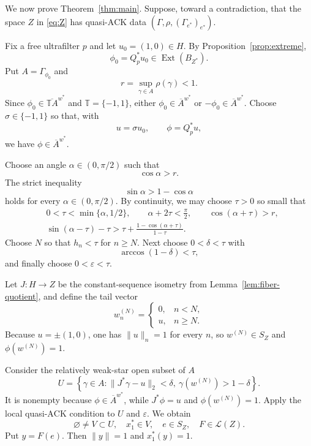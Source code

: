 \documentclass[11pt]{article}
\theoremstyle{definition}
\newcommand{\T}{\mathbb T}
\newcommand{\Ext}{\operatorname{Ext}}
\newcommand{\Lin}{\mathcal L}
\newcommand{\eps}{\varepsilon}
\newcommand{\ACK}{\mathrm{ACK}}
\begin{document}
We now prove Theorem~\ref{thm:main}.  Suppose, toward a contradiction, that the
space $Z$ in \eqref{eq:Z} has quasi-$\ACK$ data
$(\Gamma,\rho,(\Gamma_{e^*})_{e^*})$.

Fix a free ultrafilter $p$ and let $u_0=(1,0)\in H$.  By
Proposition~\ref{prop:extreme},
\[
  \phi_0=Q_p^*u_0\in\Ext(B_{Z^*}).
\]
Put $A=\Gamma_{\phi_0}$ and
\[
  r=\sup_{\gamma\in A}\rho(\gamma)<1.
\]
Since $\phi_0\in\overline{\T A}^{w^*}$ and $\T=\{-1,1\}$, either
$\phi_0\in\overline A^{w^*}$ or
$-\phi_0\in\overline A^{w^*}$.  Choose $\sigma\in\{-1,1\}$ so that, with
\[
  u=\sigma u_0,
  \qquad \phi=Q_p^*u,
\]
we have $\phi\in\overline A^{w^*}$.

Choose an angle $\alpha\in(0,\pi/2)$ such that
\begin{equation}\label{eq:alpha}
  \cos\alpha>r.
\end{equation}
The strict inequality
\[
  \sin\alpha>1-\cos\alpha
\]
holds for every $\alpha\in(0,\pi/2)$.  By continuity, we may choose
$\tau>0$ so small that
\begin{align}
 &0<\tau<\min\{\alpha,1/2\},\qquad
   \alpha+2\tau<\frac\pi2,\qquad
   \cos(\alpha+\tau)>r,                                      \label{eq:tau1}\\
 &\sin(\alpha-\tau)-\tau
   >\tau+\frac{1-\cos(\alpha+\tau)}{1-\tau}.                 \label{eq:tau2}
\end{align}
Choose $N$ so that $h_n<\tau$ for $n\ge N$.  Next choose
$0<\delta<\tau$ with
\begin{equation}\label{eq:delta}
  \arccos(1-\delta)<\tau,
\end{equation}
and finally choose $0<\eps<\tau$.

Let $J:H\to Z$ be the constant-sequence isometry from
Lemma~\ref{lem:fiber-quotient}, and define the tail vector
\[
 w^{(N)}_n=
 \begin{cases}
  0,&n<N,\\
  u,&n\ge N.
 \end{cases}
\]
Because $u=\pm(1,0)$, one has $\|u\|_n=1$ for every $n$, so
$w^{(N)}\in S_Z$ and $\phi(w^{(N)})=1$.

Consider the relatively weak-star open subset of $A$
\begin{equation}\label{eq:U}
 U=\left\{\gamma\in A:
     \|J^*\gamma-u\|_2<\delta,
     \ \gamma(w^{(N)})>1-\delta\right\}.
\end{equation}
It is nonempty because $\phi\in\overline A^{w^*}$, while
$J^*\phi=u$ and $\phi(w^{(N)})=1$.  Apply the local quasi-$\ACK$ condition
to $U$ and $\eps$.  We obtain
\[
 \varnothing\ne V\subset U,
 \quad x_1^*\in V,
 \quad e\in S_Z,
 \quad F\in\Lin(Z).
\]
Put $y=F(e)$.  Then $\|y\|=1$ and $x_1^*(y)=1$.
\end{document}

